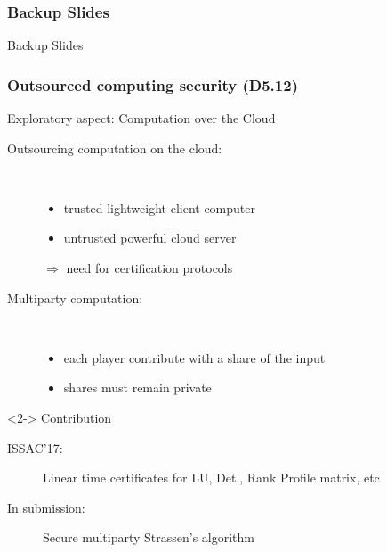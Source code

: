 \documentclass{beamer}
\begin{document}
\begin{frame}
  \frametitle{Backup Slides}

  \begin{center}
    \Large Backup Slides
  \end{center}
\end{frame}
\begin{frame}
  \frametitle{Outsourced computing security (D5.12)}

  \begin{block}{Exploratory aspect: Computation over the Cloud}
    \begin{description}
    \item[Outsourcing computation on the cloud:]\ 
      \begin{itemize}
      \item trusted lightweight client computer
      \item untrusted powerful cloud server
      \end{itemize}
      $\Rightarrow$ need for certification protocols
    \item[Multiparty computation:] \
      \begin{itemize}
      \item each player contribute with a share of the input
      \item shares must remain private
      \end{itemize}
    \end{description}
\end{block}
  \begin{block}<2->
      {Contribution}
      \begin{description}
        \item[ISSAC'17:] Linear time certificates for LU, Det., Rank Profile  matrix, etc
        \item[In submission:] Secure multiparty Strassen's algorithm
      \end{description}
  \end{block}

\end{frame}
\end{document}
